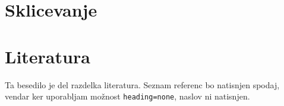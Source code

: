 \documentclass{article}
\begin{document}
\tableofcontents
\section{Sklicevanje}
\label{sec:sklicevanje}

\section{Literatura}
Ta besedilo je del razdelka literatura. Seznam referenc bo natisnjen spodaj, vendar ker uporabljam možnost \texttt{heading=none}, naslov ni natisnjen.

\nocite{*}
\printbibliography[title={Čeprav napišem naslov, se nič ne natisne}, heading=none]




\vspace{1cm}







\end{document}
